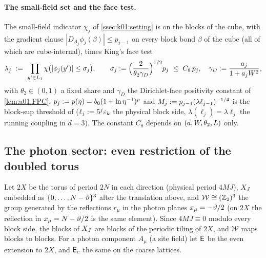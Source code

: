 \paragraph{The small-field set and the face test.} The small-field indicator $\chi_j$ of \cref{ssec:k01:setting} is \cite[(3.2)]{K1} on the blocks of the cube, with the gradient clause $|D_{A_j}\phi_j(\beta)|\le p_{j-1}$ on every block bond $\beta$ of the cube (all of which are cube-internal), times King's face test \cite[(5.41)]{K2}
\[
\lambda_j\ \defeq\ \prod_{y'\in\Lone}\chi\big(|\phi_j(y')|\le\sigma_j\big),\qquad \sigma_j\defeq\Big(\frac{2}{\theta_2\gamma_D}\Big)^{1/2}p_j\ \le\ C_8\,p_j,\quad \gamma_D\defeq\frac{a_j}{1+a_j\Wt^2},
\]
with $\theta_2\in(0,1)$ a fixed share and $\gamma_D$ the Dirichlet-face positivity constant of \cref{lem:a01:FPC}; $p_j:= p(\eta)=b_0(1+\ln\eta^{-1})^{p}$ and $M_j:= p_{j-1}(\lambda\ell_{j-1})^{-1/4}$ is the block-sup threshold of \cite[(3.2)]{K1} ($\ell_j:=5^j\varepsilon_k$ the physical block side, $\lambda(\ell_j)=\lambda\ell_j$ the running coupling in $d=3$). The constant $C_8$ depends on $(a,W,\theta_2,L)$ only.

\subsection{The photon sector: even restriction of the doubled torus}\label{app:a01:photon}

Let $2X$ be the torus of period $2N$ in each direction (physical period $4MJ$), $X_J$ embedded as $\{0,\dots,N-\vartheta\}^3$ after the translation above, and $\mathcal W\cong(\mathbb Z_2)^3$ the group generated by the reflections $r_\mu$ in the photon planes $x_\mu=-\vartheta/2$ (on $2X$ the reflection in $x_\mu=N-\vartheta/2$ is the same element). Since $4MJ\equiv0$ modulo every block side, the blocks of $X_J$ are blocks of the periodic tiling of $2X$, and $\mathcal W$ maps blocks to blocks. For a photon component $A_\mu$ (a site field) let $\mathsf E$ be the even extension to $2X$, and $\mathsf E_c$ the same on the coarse lattices.

